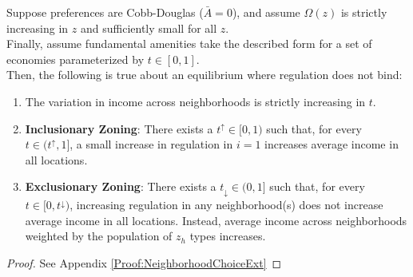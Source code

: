 \documentclass[12pt]{article}
\begin{document}
\begin{Proposition}\label{Prop:NeighborhoodChoiceExt}
	Suppose preferences are Cobb-Douglas ($\bar{A} = 0$), and assume $\Omega(z)$ is strictly increasing in $z$ and sufficiently small for all $z$. \\
	Finally, assume fundamental amenities take the described form for a set of economies parameterized by $t \in [0, 1]$. \\
	Then, the following is true about an equilibrium where regulation does not bind:
	
	\begin{enumerate}
		\item The variation in income across neighborhoods is strictly increasing in $t$.
		
		\item \textbf{Inclusionary Zoning}: There exists a $t^{\uparrow} \in [0, 1)$ such that, for every $t \in (t^{\uparrow}, 1]$, a small increase in regulation in $i = 1$ increases average income in all locations.
		
		\item \textbf{Exclusionary Zoning}: There exists a $t_{\downarrow} \in (0, 1]$ such that, for every $t \in [0, t^{\downarrow})$, increasing regulation in any neighborhood(s) does not increase average income in all locations. Instead, average income across neighborhoods weighted by the population of $z_{h}$ types increases. 
	\end{enumerate}
\end{Proposition}
\begin{proof}
	See Appendix \ref{Proof:NeighborhoodChoiceExt}
\end{proof}
\end{document}
